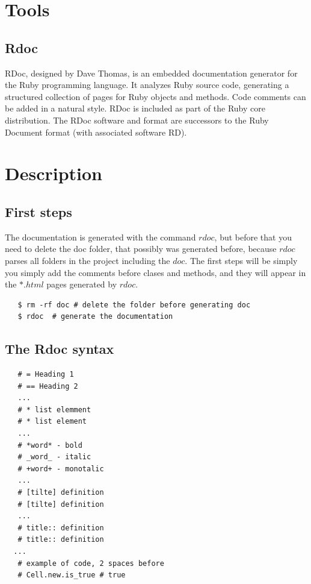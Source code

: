 \documentclass{article}
\begin{document}
  \section{Tools}

  \subsection{Rdoc}
  RDoc, designed by Dave Thomas, is an embedded documentation generator for the Ruby programming language. 
  It analyzes Ruby source code, generating a structured collection of pages for Ruby objects and methods. 
  Code comments can be added in a natural style. RDoc is included as part of the Ruby core distribution. 
  The RDoc software and format are successors to the Ruby Document format (with associated software RD).

  \section{Description}

  \subsection{First steps}  

  The documentation is generated with the command $rdoc$, but before that you need to delete the doc 
  folder, that possibly was generated before, because $rdoc$ parses all folders in the project 
  including the $doc$. The first steps will be simply you simply add the comments before clases 
  and methods, and they will appear in the $*.html$ pages generated by $rdoc$.

  \lstset{language=Ruby}
   \begin{lstlisting}
   $ rm -rf doc # delete the folder before generating doc
   $ rdoc  # generate the documentation
   \end{lstlisting}

  \subsection{The Rdoc syntax}  

   \begin{lstlisting}
   # = Heading 1
   # == Heading 2
   ...
   # * list elemment
   # * list element
   ... 
   # *word* - bold 
   # _word_ - italic
   # +word+ - monotalic
   ...
   # [tilte] definition
   # [tilte] definition
   ...
   # title:: definition
   # title:: definition
  ...
   # example of code, 2 spaces before
   # Cell.new.is_true # true
   \end{lstlisting}
\end{document}

